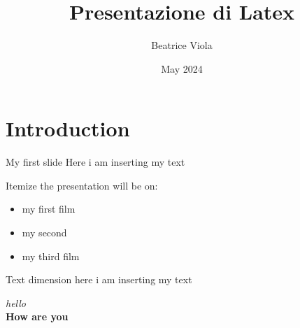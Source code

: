 \documentclass{beamer}
\title{Presentazione di Latex}
\author{Beatrice Viola}
\date{May 2024}
\begin{document}

\maketitle


\section{Introduction}

\begin{frame}{My first slide} %
    Here i am inserting my text
\end{frame}

\begin{frame}{Itemize}
the presentation will be on:
    \begin{itemize} %
        \item my first film
        \item \pause my second 
        \item \pause my third film
    \end{itemize}
\end{frame}

\begin{frame}{Text dimension} 
    \scriptsize{here i am inserting my text}
\end{frame}

\begin{frame}{4} 
    \textit{hello}\\ %
    \textbf{How are you} \\ %
    \bigskip %
\end{frame}
\end{document}
